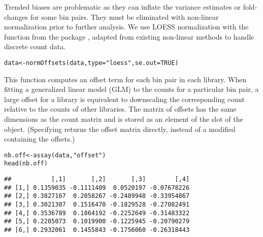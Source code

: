 \documentclass{report}\usepackage[]{graphicx}\usepackage[usenames,dvipsnames]{color}
\newcommand{\hlnum}[1]{\textcolor[rgb]{0.816,0.125,0.439}{#1}}%
\newcommand{\hlstr}[1]{\textcolor[rgb]{0.251,0.627,0.251}{#1}}%
\newcommand{\hlstd}[1]{\textcolor[rgb]{0.251,0.251,0.251}{#1}}%
\newcommand{\hlkwb}[1]{\textcolor[rgb]{0,0,0}{#1}}%
\newcommand{\hlkwc}[1]{\textcolor[rgb]{0.251,0.251,0.251}{#1}}%
\newcommand{\hlkwd}[1]{\textcolor[rgb]{0.878,0.439,0.125}{#1}}%
\newenvironment{knitrout}{}{} %
\begin{document}
Trended biases are problematic as they can inflate the variance estimates or fold-changes for some bin pairs. 
They must be eliminated with non-linear normalization prior to further analysis.
We use LOESS normalization with the  function from the  package \cite{lun2016csaw}, adapted from existing non-linear methods to handle discrete count data. 

\begin{knitrout}
\color{fgcolor}\begin{kframe}
\begin{alltt}
\hlstd{data} \hlkwb{<-} \hlkwd{normOffsets}\hlstd{(data,} \hlkwc{type}\hlstd{=}\hlstr{"loess"}\hlstd{,} \hlkwc{se.out}\hlstd{=}\hlnum{TRUE}\hlstd{)}
\end{alltt}
\end{kframe}
\end{knitrout}

This function computes an offset term for each bin pair in each library.
When fitting a generalized linear model (GLM) to the counts for a particular bin pair, a large offset for a library is equivalent to downscaling the corresponding count relative to the counts of other libraries. 
The matrix of offsets has the same dimensions as the count matrix and is stored as an element of the  slot of the  object.
(Specifying  returns the offset matrix directly, instead of a modified  containing the offsets.)

\begin{knitrout}
\color{fgcolor}\begin{kframe}
\begin{alltt}
\hlstd{nb.off} \hlkwb{<-} \hlkwd{assay}\hlstd{(data,} \hlstr{"offset"}\hlstd{)}
\hlkwd{head}\hlstd{(nb.off)}
\end{alltt}
\begin{verbatim}
##           [,1]       [,2]       [,3]        [,4]
## [1,] 0.1359035 -0.1111409  0.0520197 -0.07678226
## [2,] 0.3827167  0.2058267 -0.2489948 -0.33954867
## [3,] 0.3021307  0.1516470 -0.1829528 -0.27082491
## [4,] 0.3536789  0.1864192 -0.2252649 -0.31483322
## [5,] 0.2285073  0.1019900 -0.1225945 -0.20790279
## [6,] 0.2932061  0.1455843 -0.1756060 -0.26318443
\end{verbatim}
\end{kframe}
\end{knitrout}
\end{document}
